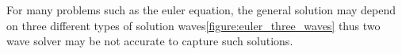 \begin{sectionbox}\nospacing
    For many problems such as the euler equation, the general solution may depend on three different types of
    solution waves\cref{figure:euler_three_waves} thus two wave solver may be not accurate to capture such solutions.
\end{sectionbox}
